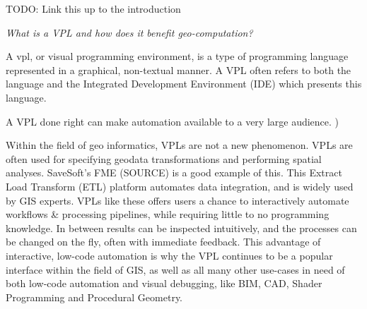 \begin{note}
TODO: Link this up to the introduction
\end{note}

\emph{What is a VPL and how does it benefit geo-computation?}

A \ac{vpl}, or visual programming environment, is a type of programming language represented in a graphical, non-textual manner.
A VPL often refers to both the language and the Integrated Development Environment (IDE) which presents this language.

A VPL done right can make automation available to a very large audience. )

Within the field of geo informatics, \ac{VPL}s are not a new phenomenon. VPLs are often used for specifying geodata transformations and performing spatial analyses.  
SaveSoft's FME (SOURCE) is a good example of this. This Extract Load Transform (ETL) platform automates data integration, and is widely used by GIS experts. 
VPLs like these offers users a chance to interactively automate workflows \& processing pipelines, while requiring little to no programming knowledge. 
In between results can be inspected intuitively, and the processes can be changed on the fly, often with immediate feedback.
This advantage of interactive, low-code automation is why the VPL continues to be a popular interface within the field of GIS, as well as all many other use-cases in need of both low-code automation and visual debugging, like BIM, CAD, Shader Programming and Procedural Geometry. 




